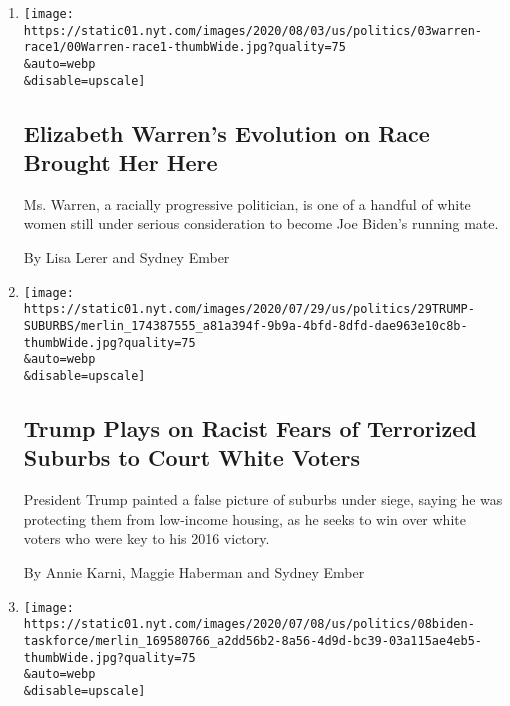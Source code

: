 \begin{enumerate}
\def\labelenumi{\arabic{enumi}.}
\item
  \href{/2020/08/02/us/politics/elizabeth-warren-biden-vice-president.html}{}

  \texttt{[image: https://static01.nyt.com/images/2020/08/03/us/politics/03warren-race1/00Warren-race1-thumbWide.jpg?quality=75\\\&auto=webp\\\&disable=upscale]}

  \hypertarget{elizabeth-warrens-evolution-on-race-brought-her-here}{%
  \subsection{Elizabeth Warren's Evolution on Race Brought Her
  Here}\label{elizabeth-warrens-evolution-on-race-brought-her-here}}

  Ms. Warren, a racially progressive politician, is one of a handful of
  white women still under serious consideration to become Joe Biden's
  running mate.

  By Lisa Lerer and Sydney Ember
\item
  \href{/2020/07/29/us/politics/trump-suburbs-housing-white-voters.html}{}

  \texttt{[image: https://static01.nyt.com/images/2020/07/29/us/politics/29TRUMP-SUBURBS/merlin\_174387555\_a81a394f-9b9a-4bfd-8dfd-dae963e10c8b-thumbWide.jpg?quality=75\\\&auto=webp\\\&disable=upscale]}

  \hypertarget{trump-plays-on-racist-fears-of-terrorized-suburbs-to-court-white-voters}{%
  \subsection{Trump Plays on Racist Fears of Terrorized Suburbs to Court
  White
  Voters}\label{trump-plays-on-racist-fears-of-terrorized-suburbs-to-court-white-voters}}

  President Trump painted a false picture of suburbs under siege, saying
  he was protecting them from low-income housing, as he seeks to win
  over white voters who were key to his 2016 victory.

  By Annie Karni, Maggie Haberman and Sydney Ember
\item
  \href{/2020/07/08/us/politics/biden-bernie-sanders.html}{}

  \texttt{[image: https://static01.nyt.com/images/2020/07/08/us/politics/08biden-taskforce/merlin\_169580766\_a2dd56b2-8a56-4d9d-bc39-03a115ae4eb5-thumbWide.jpg?quality=75\\\&auto=webp\\\&disable=upscale]}


\end{enumerate}
